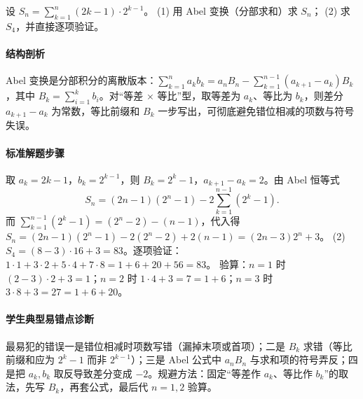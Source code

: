 \begin{problem}
设 $S_n=\sum\limits_{k=1}^n(2k-1)\cdot2^{k-1}$。
(1) 用 Abel 变换（分部求和）求 $S_n$；
(2) 求 $S_4$，并直接逐项验证。
\end{problem}
\begin{solution}
\paragraph{结构剖析}
Abel 变换是分部积分的离散版本：$\sum_{k=1}^n a_kb_k=a_nB_n-\sum_{k=1}^{n-1}(a_{k+1}-a_k)B_k$，其中 $B_k=\sum_{i=1}^k b_i$。对“等差 $\times$ 等比”型，取等差为 $a_k$、等比为 $b_k$，则差分 $a_{k+1}-a_k$ 为常数，等比前缀和 $B_k$ 一步写出，可彻底避免错位相减的项数与符号失误。
\paragraph{标准解题步骤}
取 $a_k=2k-1$，$b_k=2^{k-1}$，则 $B_k=2^k-1$，$a_{k+1}-a_k=2$。由 Abel 恒等式
$$S_n=(2n-1)(2^n-1)-2\sum_{k=1}^{n-1}(2^k-1).$$
而 $\sum_{k=1}^{n-1}(2^k-1)=(2^n-2)-(n-1)$，代入得
$S_n=(2n-1)(2^n-1)-2(2^n-2)+2(n-1)=(2n-3)2^n+3$。
(2) $S_4=(8-3)\cdot16+3=83$。逐项验证：$1\cdot1+3\cdot2+5\cdot4+7\cdot8=1+6+20+56=83$。
验算：$n=1$ 时 $(2-3)\cdot2+3=1$；$n=2$ 时 $1\cdot4+3=7=1+6$；$n=3$ 时 $3\cdot8+3=27=1+6+20$。
\paragraph{学生典型易错点诊断}
最易犯的错误一是错位相减时项数写错（漏掉末项或首项）；二是 $B_k$ 求错（等比前缀和应为 $2^k-1$ 而非 $2^{k-1}$）；三是 Abel 公式中 $a_nB_n$ 与求和项的符号弄反；四是把 $a_k,b_k$ 取反导致差分变成 $-2$。规避方法：固定“等差作 $a_k$、等比作 $b_k$”的取法，先写 $B_k$，再套公式，最后代 $n=1,2$ 验算。
\end{solution}

